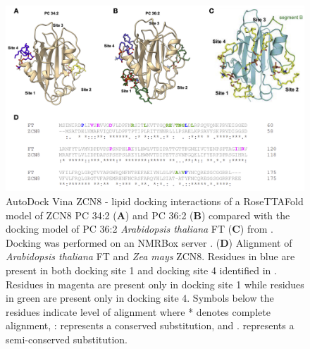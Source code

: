 \documentclass[9pt,twocolumn,twoside,lineno]{biorxiv}
\begin{document}
\clearpage

\begin{figure}[t]
\begin{center}
\includegraphics[width=0.8 \paperwidth]{Sup_Figures/Sup_Fig_12.png}
\caption{ AutoDock Vina \cite{Trott2010-su} ZCN8 - lipid docking interactions of a RoseTTAFold \cite{baek2021sci} model of ZCN8 PC 34:2 (\textbf{A}) and PC 36:2 (\textbf{B}) compared with the docking model of PC 36:2 \textit{Arabidopsis thaliana} FT (\textbf{C}) from \cite{Nakamura2019-ht}. 
Docking was performed on an NMRBox server \cite{maciejewski2010bj}.
(\textbf{D}) Alignment of \textit{Arabidopsis thaliana} FT and \textit{Zea mays} ZCN8. 
Residues in blue are present in both docking site 1 and docking site 4 identified in \cite{Nakamura2019-ht}. 
Residues in magenta are present only in docking site 1 while residues in green are present only in docking site 4. 
Symbols below the residues indicate level of alignment where * denotes complete alignment, : represents a conserved substitution, and . represents a semi-conserved substitution.}
\label{figure:Sup:Docking}
\end{center}
\end{figure} 
\end{document}
